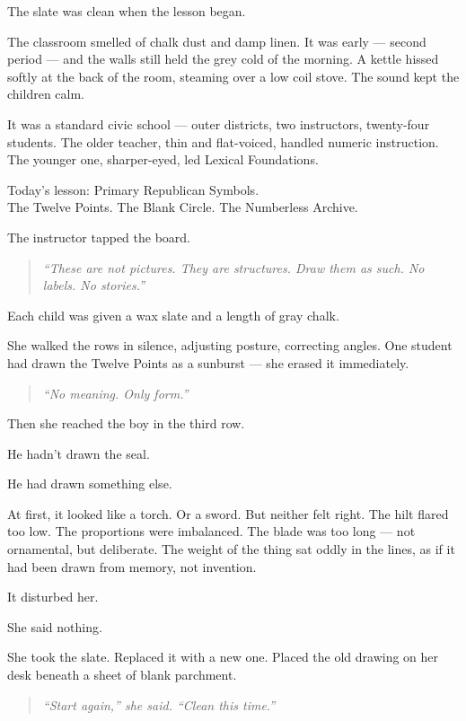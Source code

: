 \documentclass[12pt]{article}
\begin{document}
The slate was clean when the lesson began.

The classroom smelled of chalk dust and damp linen. It was early --- second period --- and the walls still held the grey cold of the morning. A kettle hissed softly at the back of the room, steaming over a low coil stove. The sound kept the children calm.

It was a standard civic school --- outer districts, two instructors, twenty-four students. The older teacher, thin and flat-voiced, handled numeric instruction. The younger one, sharper-eyed, led Lexical Foundations.

Today’s lesson: Primary Republican Symbols.\\
The Twelve Points. The Blank Circle. The Numberless Archive.

The instructor tapped the board.

\begin{quote}
\textit{“These are not pictures. They are structures. Draw them as such. No labels. No stories.”}
\end{quote}

Each child was given a wax slate and a length of gray chalk.

She walked the rows in silence, adjusting posture, correcting angles. One student had drawn the Twelve Points as a sunburst --- she erased it immediately.

\begin{quote}
\textit{“No meaning. Only form.”}
\end{quote}

Then she reached the boy in the third row.

He hadn’t drawn the seal.

He had drawn something else.

At first, it looked like a torch. Or a sword. But neither felt right. The hilt flared too low. The proportions were imbalanced. The blade was too long --- not ornamental, but deliberate. The weight of the thing sat oddly in the lines, as if it had been drawn from memory, not invention.

It disturbed her.

She said nothing.

She took the slate. Replaced it with a new one. Placed the old drawing on her desk beneath a sheet of blank parchment.

\begin{quote}
\textit{“Start again,” she said. “Clean this time.”}
\end{quote}
\end{document}
